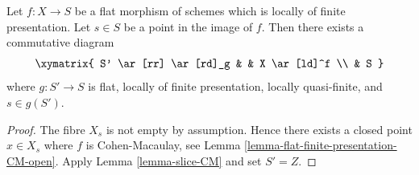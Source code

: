 \begin{lemma}
\label{lemma-qf-fp-flat-neighbourhood-dominates-fppf}
Let $f : X \to S$ be a flat morphism of schemes which is
locally of finite presentation. Let $s \in S$ be a point in the image of $f$.
Then there exists a commutative diagram
$$
\xymatrix{
S' \ar[rr] \ar[rd]_g & & X \ar[ld]^f \\
& S
}
$$
where $g : S' \to S$ is flat, locally of finite presentation,
locally quasi-finite, and $s \in g(S')$.
\end{lemma}

\begin{proof}
The fibre $X_s$ is not empty by assumption. Hence there exists a closed
point $x \in X_s$ where $f$ is Cohen-Macaulay, see
Lemma \ref{lemma-flat-finite-presentation-CM-open}.
Apply
Lemma \ref{lemma-slice-CM}
and set $S' = Z$.
\end{proof}
